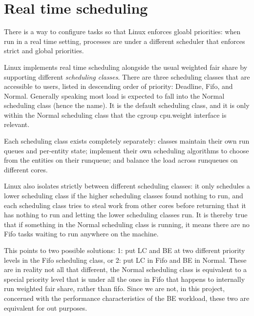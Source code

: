 
\section{Real time scheduling}
\label{sec:sched-rt}

There is a way to configure tasks so that Linux enforces gloabl priorities: when
run in a real time setting, processes are under a different scheduler that
enforces strict and global priorities.

Linux implements real time scheduling alongside the usual weighted fair share by
supporting different \textit{scheduling classes}. There are three scheduling
classes that are accessible to users, listed in descending order of priority:
Deadline, Fifo, and Normal. Generally speaking most load is expected to fall
into the Normal scheduling class (hence the name). It is the default scheduling
class, and it is only within the Normal scheduling class that the cgroup
cpu.weight interface is relevant.

Each scheduling class exists completely separately: classes maintain their own
run queues and per-entity state; implement their own scheduling algorithms to
choose from the entities on their runqueue; and balance the load across
runqueues on different cores.

Linux also isolates strictly between different scheduling classes: it only
schedules a lower scheduling class if the higher scheduling classes found
nothing to run, and each scheduling class tries to steal work from other cores
before returning that it has nothing to run and letting the lower scheduling
classes run. It is thereby true that if something in the Normal scheduling class
is running, it means there are no Fifo tasks waiting to run anywhere on the
machine.

This points to two possible solutions: 1: put LC and BE at two different priority
levels in the Fifo scheduling class, or 2: put LC in Fifo and BE in Normal. These
are in reality not all that different, the Normal scheduling class is equivalent
to a special priority level that is under all the ones in Fifo that happens to
internally run weighted fair share, rather than fifo. Since we are not, in this
project, concerned with the performance characteristics of the BE workload,
these two are equivalent for out purposes.

